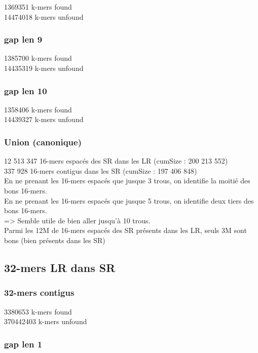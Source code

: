 \documentclass[12pt]{article}
\begin{document}
1369351 k-mers found \\
14474018 k-mers unfound

\subsubsection{gap len 9}

1385700 k-mers found \\
14435319 k-mers unfound

\subsubsection{gap len 10}

1358406 k-mers found \\
14439327 k-mers unfound

\subsubsection{Union (canonique)}

12 513 347 16-mers espacés des SR dans les LR (cumSize : 200 213 552) \\
 337 928 16-mers contigus dans les SR (cumSize : 197 406 848) \\

En ne prenant les 16-mers espacés que jusque 3 trous, on identifie la moitié des bons 16-mers. \\
En ne prenant les 16-mers espacés que jusque 5 trous, on identifie deux tiers des bons 16-mers. \\
=> Semble utile de bien aller jusqu'à 10 trous. \\

Parmi les 12M de 16-mers espacés des SR présents dans les LR, seuls 3M sont bons (bien présents dans les SR)

\subsection{32-mers LR dans SR}

\subsubsection{32-mers contigus}

3380653 k-mers found \\
370442403 k-mers unfound

\subsubsection{gap len 1}
\end{document}
